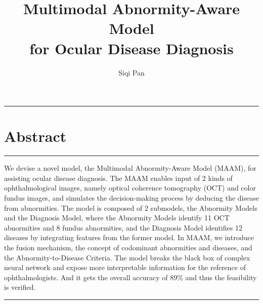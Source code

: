 \documentclass{article}
\begin{document}
	\title{\vspace{-2.25cm} Multimodal Abnormity-Aware Model\\for Ocular Disease Diagnosis}
	\author{Siqi Pan}
	\date{}
	\maketitle
	
	\vspace{-0.2cm}
	\hrule
	\vspace{-0.1cm}
	\section*{Abstract}
	\hrule
	\vspace{0.4cm}
	We devise a novel model, the Multimodal Abnormity-Aware Model (MAAM), for assisting ocular disease diagnosis. The MAAM enables input of 2 kinds of ophthalmological images, namely optical coherence tomography (OCT) and color fundus images, and simulates the decision-making process by deducing the disease from abnormities. The model is composed of 2 submodels, the Abnormity Models and the Diagnosis Model, where the Abnormity Models identify 11 OCT abnormities and 8 fundus abnormities, and the Diagnosis Model identifies 12 diseases by integrating features from the former model. In MAAM, we introduce the fusion mechanism, the concept of codominant abnormities and diseases, and the Abnormity-to-Disease Criteria.  The model breaks the black box of complex neural network and expose more interpretable information for the reference of ophthalmologists. And it gets the overall accuracy of 89\% and thus the feasibility is verified.
	\vspace{0.4cm}
	\hrule
	\vspace{1cm}
	
\end{document}
